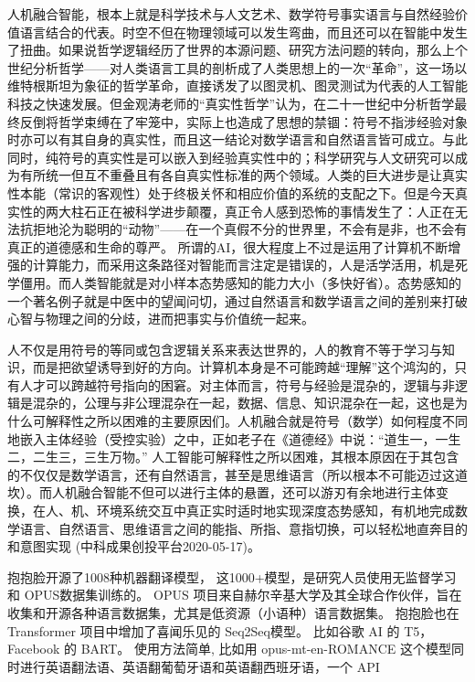 人机融合智能，根本上就是科学技术与人文艺术、数学符号事实语言与自然经验价值语言结合的代表。时空不但在物理领域可以发生弯曲，而且还可以在智能中发生了扭曲。如果说哲学逻辑经历了世界的本源问题、研究方法问题的转向，那么上个世纪分析哲学——对人类语言工具的剖析成了人类思想上的一次“革命”，这一场以维特根斯坦为象征的哲学革命，直接诱发了以图灵机、图灵测试为代表的人工智能科技之快速发展。但金观涛老师的“真实性哲学”认为，在二十一世纪中分析哲学最终反倒将哲学束缚在了牢笼中，实际上也造成了思想的禁锢：符号不指涉经验对象时亦可以有其自身的真实性，而且这一结论对数学语言和自然语言皆可成立。与此同时，纯符号的真实性是可以嵌入到经验真实性中的；科学研究与人文研究可以成为有所统一但互不重叠且有各自真实性标准的两个领域。人类的巨大进步是让真实性本能（常识的客观性）处于终极关怀和相应价值的系统的支配之下。但是今天真实性的两大柱石正在被科学进步颠覆，真正令人感到恐怖的事情发生了：人正在无法抗拒地沦为聪明的“动物”——在一个真假不分的世界里，不会有是非，也不会有真正的道德感和生命的尊严。
所谓的AI，很大程度上不过是运用了计算机不断增强的计算能力，而采用这条路径对智能而言注定是错误的，人是活学活用，机是死学僵用。而人类智能就是对小样本态势感知的能力大小（多快好省）。态势感知的一个著名例子就是中医中的望闻问切，通过自然语言和数学语言之间的差别来打破心智与物理之间的分歧，进而把事实与价值统一起来。

人不仅是用符号的等同或包含逻辑关系来表达世界的，人的教育不等于学习与知识，而是把欲望诱导到好的方向。计算机本身是不可能跨越“理解”这个鸿沟的，只有人才可以跨越符号指向的困窘。对主体而言，符号与经验是混杂的，逻辑与非逻辑是混杂的，公理与非公理混杂在一起，数据、信息、知识混杂在一起，这也是为什么可解释性之所以困难的主要原因们。人机融合就是符号（数学）如何程度不同地嵌入主体经验（受控实验）之中，正如老子在《道德经》中说：“道生一，一生二，二生三，三生万物。”
人工智能可解释性之所以困难，其根本原因在于其包含的不仅仅是数学语言，还有自然语言，甚至是思维语言（所以根本不可能迈过这道坎）。而人机融合智能不但可以进行主体的悬置，还可以游刃有余地进行主体变换，在人、机、环境系统交互中真正实时适时地实现深度态势感知，有机地完成数学语言、自然语言、思维语言之间的能指、所指、意指切换，可以轻松地直奔目的和意图实现 (中科成果创投平台2020-05-17)。

抱抱脸开源了1008种机器翻译模型， 这1000+模型，是研究人员使用无监督学习和 OPUS数据集训练的。  
OPUS 项目来自赫尔辛基大学及其全球合作伙伴，旨在收集和开源各种语言数据集，尤其是低资源（小语种）语言数据集。
抱抱脸也在 Transformer 项目中增加了喜闻乐见的 Seq2Seq模型。
比如谷歌 AI 的 T5，Facebook 的 BART。
使用方法简单, 比如用 opus-mt-en-ROMANCE 这个模型同时进行英语翻法语、英语翻葡萄牙语和英语翻西班牙语，一个 API 

